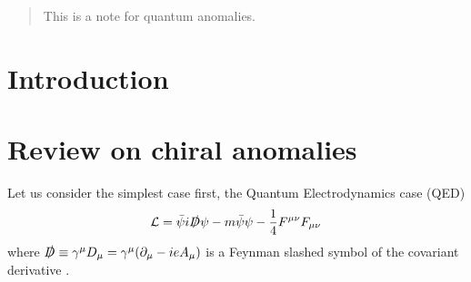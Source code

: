 \documentclass[a4paper,pdftex,10pt]{article}
\begin{document}
\maketitle

\begin{abstract}
  This is a note for quantum anomalies. 
\end{abstract}

\tableofcontents

\clearpage
\section{Introduction}





\clearpage
\section{Review on chiral anomalies}

Let us consider the simplest case first, the Quantum Electrodynamics case (QED)
\begin{equation}
  \mathcal{L}
  =
  \bar{\psi}i\slashed{D}\psi
  -
  m\bar{\psi}\psi
  -
  \frac{1}{4}F^{\mu\nu}F_{\mu\nu}
\end{equation}
where $\slashed{D}\equiv\gamma^{\mu}D_{\mu}=\gamma^{\mu}(\partial_{\mu}-ieA_{\mu})$ is a Feynman slashed symbol of the covariant derivative .











\clearpage



\nocite{Arkani-Hamed:2001uol}

\end{document}
